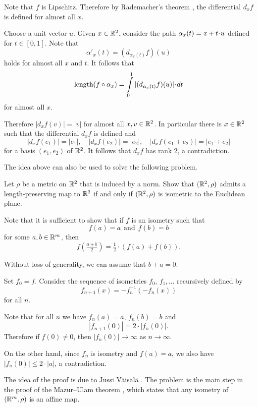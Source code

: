 Note that $f$ is Lipschitz.
Therefore by Rademacher's theorem \cite{rademacher}, the differential $d_xf$ is defined for  almost all $x$.

Choose a unit vector $u$.
Given $x\in\mathbb{R}^2$,
consider the path $\alpha_x(t)\z=x+t\cdot u$ defined for $t\in [0,1]$.
Note that  
\[\alpha'_x(t)=(d_{\alpha_x(t)}f)(u)\]
holds for almost all $x$ and $t$.
It follows that 
\[\length(f\circ\alpha_x)=\int\limits_0^1 |(d_{\alpha_x(t)}f)(u)| \cdot dt\]
for almost all $x$.

Therefore $|d_xf(v)|=|v|$ for almost all $x,v\in\mathbb{R}^2$.
In particular there is $x\in\mathbb{R}^2$ such that the differential $d_xf$ is defined 
and 
\[|d_xf(e_1)|=|e_1|,
\quad
|d_xf(e_2)|=|e_2|,
\quad
|d_xf(e_1+e_2)|=|e_1+e_2|\]
for a basis $(e_1,e_2)$ of $\mathbb{R}^2$.
It follows that $d_xf$ has rank 2, a contradiction. \qeds 


The idea above can also be used to solve the following problem.

\begin{pr} Let $\rho$ be a metric on $\mathbb{R}^2$ that is induced by a norm.
Show that $(\mathbb{R}^2,\rho)$ admits 
a length-preserving map
to $\mathbb{R}^3$ 
if and only if 
$(\mathbb{R}^2,\rho)$ is isometric to the Euclidean plane.
\end{pr}








Note that it is sufficient to show that 
if $f$ is an isometry such that
\[f(a)=a\ \ \text{and}\ \ f(b)=b\]
for some $a,b\in\mathbb{R}^m$,
then 
\[f(\tfrac{a+b}2)=\tfrac12\cdot(f(a)+f(b)).\]


Without loss of generality, we can assume that $b+a=0$.

Set $f_0=f$.
Consider the sequence of isometries $f_0$, $f_1,\dots$ recursively defined by
\[f_{n+1}(x)= -f_n^{-1}(-f_n(x))\]
for all $n$.

Note that for all $n$ we have $f_n(a)=a$, $f_n(b)=b$ and 
$$|f_{n+1}(0)|=2\cdot|f_n(0)|.$$
Therefore  
if $f(0)\ne 0$,
then $|f_n(0)|\to\infty$ as $n\to\infty$.

On the other hand, since $f_n$ is isometry and $f(a)=a$,
we also have $|f_n(0)|\le 2\cdot |a|$, a contradiction.
\qeds

The idea of the proof is due to  Jussi V\"ais\"al\"a \cite{vaisala}.
The problem is the main step in the proof of the Mazur--Ulam theorem \cite{mazur-ulam},
which states that any isometry of $(\mathbb{R}^m,\rho)$ is an affine map. 


